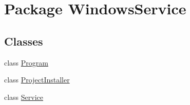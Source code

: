 \hypertarget{namespace_windows_service}{\section{Package Windows\-Service}
\label{namespace_windows_service}
}
\subsection*{Classes}
\begin{DoxyCompactItemize}
\item 
class \hyperlink{class_windows_service_1_1_program}{Program}
\item 
class \hyperlink{class_windows_service_1_1_project_installer}{Project\-Installer}
\item 
class \hyperlink{class_windows_service_1_1_service}{Service}
\end{DoxyCompactItemize}
